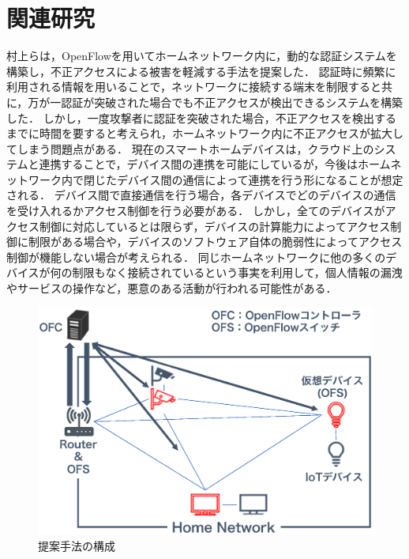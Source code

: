 \documentclass[a4paper,10pt,twocolumn,uplatex]{jsarticle}
\begin{document}
\section{関連研究}
村上らは，OpenFlowを用いてホームネットワーク内に，動的な認証システムを構築し，不正アクセスによる被害を軽減する手法を提案した\cite{related}．
認証時に頻繁に利用される情報を用いることで，ネットワークに接続する端末を制限すると共に，万が一認証が突破された場合でも不正アクセスが検出できるシステムを構築した．
しかし，一度攻撃者に認証を突破された場合，不正アクセスを検出するまでに時間を要すると考えられ，ホームネットワーク内に不正アクセスが拡大してしまう問題点がある．
現在のスマートホームデバイスは，クラウド上のシステムと連携することで，デバイス間の連携を可能にしているが，今後はホームネットワーク内で閉じたデバイス間の通信によって連携を行う形になることが想定される\cite{d2d}．
デバイス間で直接通信を行う場合，各デバイスでどのデバイスの通信を受け入れるかアクセス制御を行う必要がある．
しかし，全てのデバイスがアクセス制御に対応しているとは限らず，デバイスの計算能力によってアクセス制御に制限がある場合や，デバイスのソフトウェア自体の脆弱性によってアクセス制御が機能しない場合が考えられる．
同じホームネットワークに他の多くのデバイスが何の制限もなく接続されているという事実を利用して，個人情報の漏洩やサービスの操作など，悪意のある活動が行われる可能性がある\cite{disap}．

\begin{figure}[!tb]
  \centering
  \includegraphics[width=\linewidth]{img/architecture.eps}
  \caption{提案手法の構成}
  \label{fig:architecture}
\end{figure}

\end{document}
